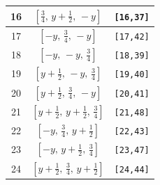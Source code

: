 \documentclass[fleqn,8pt]{jsarticle}
\begin{document}
\begin{longtable}{ccc}
16 & $\left[ \frac{3}{4},\, y + \frac{1}{2},\, - y \right]$ & {\tt [16,37]} \\ \hline
17 & $\left[ - y,\, \frac{3}{4},\, - y \right]$ & {\tt [17,42]} \\ \hline
18 & $\left[ - y,\, - y,\, \frac{3}{4} \right]$ & {\tt [18,39]} \\ \hline
19 & $\left[ y + \frac{1}{2},\, - y,\, \frac{3}{4} \right]$ & {\tt [19,40]} \\ \hline
20 & $\left[ y + \frac{1}{2},\, \frac{3}{4},\, - y \right]$ & {\tt [20,41]} \\ \hline
21 & $\left[ y + \frac{1}{2},\, y + \frac{1}{2},\, \frac{3}{4} \right]$ & {\tt [21,48]} \\ \hline
22 & $\left[ - y,\, \frac{3}{4},\, y + \frac{1}{2} \right]$ & {\tt [22,43]} \\ \hline
23 & $\left[ - y,\, y + \frac{1}{2},\, \frac{3}{4} \right]$ & {\tt [23,47]} \\ \hline
24 & $\left[ y + \frac{1}{2},\, \frac{3}{4},\, y + \frac{1}{2} \right]$ & {\tt [24,44]} \\
\end{longtable}
\renewcommand{\arraystretch}{1.2}
\end{document}
